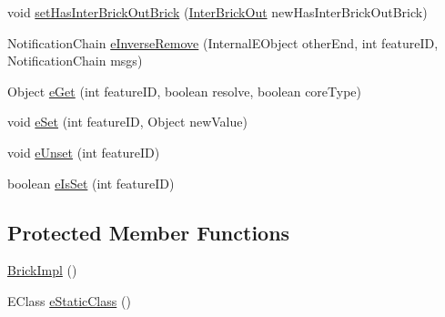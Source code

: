 \begin{DoxyCompactItemize}
\item 
void \hyperlink{classshootingmachineemfmodel_1_1impl_1_1_brick_impl_a50ea2727f2d9e690aaa08d9cd1e6e603}{set\-Has\-Inter\-Brick\-Out\-Brick} (\hyperlink{interfaceshootingmachineemfmodel_1_1_inter_brick_out}{Inter\-Brick\-Out} new\-Has\-Inter\-Brick\-Out\-Brick)
\item 
Notification\-Chain \hyperlink{classshootingmachineemfmodel_1_1impl_1_1_brick_impl_ab104509cb1d14e590907d4f1e6c97517}{e\-Inverse\-Remove} (Internal\-E\-Object other\-End, int feature\-I\-D, Notification\-Chain msgs)
\item 
Object \hyperlink{classshootingmachineemfmodel_1_1impl_1_1_brick_impl_ae52c9aede3f2a992c28aa6f5996b0ee1}{e\-Get} (int feature\-I\-D, boolean resolve, boolean core\-Type)
\item 
void \hyperlink{classshootingmachineemfmodel_1_1impl_1_1_brick_impl_aebe50ab82342ebbd6596307d09c15ef7}{e\-Set} (int feature\-I\-D, Object new\-Value)
\item 
void \hyperlink{classshootingmachineemfmodel_1_1impl_1_1_brick_impl_a04bba07f71fa09ed3df6d5ffab255d6d}{e\-Unset} (int feature\-I\-D)
\item 
boolean \hyperlink{classshootingmachineemfmodel_1_1impl_1_1_brick_impl_afe010a7a25132e73190ee361d5579eff}{e\-Is\-Set} (int feature\-I\-D)
\end{DoxyCompactItemize}
\subsection*{Protected Member Functions}
\begin{DoxyCompactItemize}
\item 
\hyperlink{classshootingmachineemfmodel_1_1impl_1_1_brick_impl_ab864ec8e7a2244a893b3f0cd5053ddd3}{Brick\-Impl} ()
\item 
E\-Class \hyperlink{classshootingmachineemfmodel_1_1impl_1_1_brick_impl_ad74b2984ba5a457c19e984162e0f7e3f}{e\-Static\-Class} ()
\end{DoxyCompactItemize}
